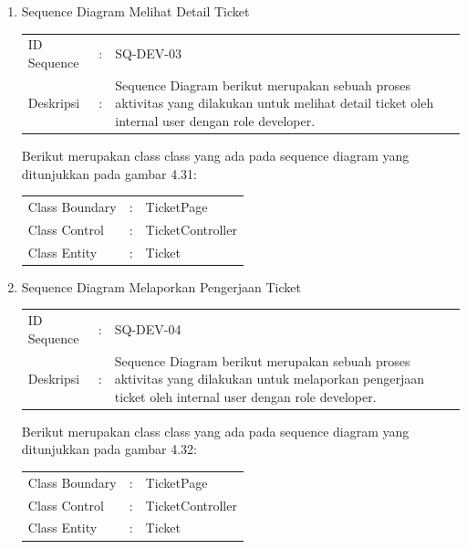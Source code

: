 \documentclass[12pt]{article}
\begin{document}
\begin{enumerate}[label=\textbf{4.\arabic*.}]
\begin{enumerate} [label=\textbf{4.2.\arabic*.}, wide, labelwidth=!, labelindent=0pt]
\begin{enumerate}[label=\textbf{4.2.2.\arabic*.}, wide, labelwidth=!, labelindent=0pt]
\begin{enumerate}[label=\arabic*.]
                \item Sequence Diagram Melihat Detail Ticket
                
                \begin{tabularx}{.9\linewidth}{@{} l l X @{}}
                    ID Sequence &	: & SQ-DEV-03 \\
                    Deskripsi &	: & Sequence Diagram berikut merupakan sebuah proses aktivitas yang dilakukan untuk melihat detail ticket oleh internal user dengan role developer. 
        
                \end{tabularx}

                \noindent Berikut merupakan class class yang ada pada sequence diagram yang ditunjukkan pada gambar 4.31:

                \begin{tabularx}{.9\linewidth}{@{} l l X @{}}
                    Class Boundary & : & TicketPage \\
                    Class Control & : & TicketController \\
                    Class Entity & : & Ticket
                
                \end{tabularx}
                
                \item Sequence Diagram Melaporkan Pengerjaan Ticket
                
                \begin{tabularx}{.9\linewidth}{@{} l l X @{}}
                    ID Sequence &	: & SQ-DEV-04 \\
                    Deskripsi &	: & Sequence Diagram berikut merupakan sebuah proses aktivitas yang dilakukan untuk melaporkan pengerjaan ticket oleh internal user dengan role developer. 
        
                \end{tabularx}

                \noindent Berikut merupakan class class yang ada pada sequence diagram yang ditunjukkan pada gambar 4.32:

                \begin{tabularx}{.9\linewidth}{@{} l l X @{}}
                    Class Boundary & : & TicketPage \\
                    Class Control & : & TicketController \\
                    Class Entity & : & Ticket
                

\end{tabularx}
\end{enumerate}
\end{enumerate}
\end{enumerate}
\end{enumerate}
\end{document}
